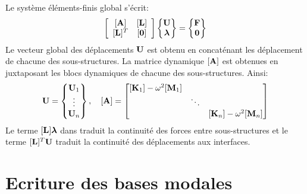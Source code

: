 \documentclass[10pt,a4paper,french]{report}
\begin{document}
Le système éléments-finis global s'écrit:
\begin{equation}\label{eq:systeme EF discretise n sous-structures}
	\left[
	\begin{array}{cc}
		{[\textbf{A}]} & {[\textbf{L}]}\\
		{[\textbf{L}]^T}& {[\textbf{0}]}
	\end{array}
	\right]\begin{Bmatrix}
		\textbf{U}\\\boldsymbol{\lambda}
	\end{Bmatrix}=\begin{Bmatrix}
		\textbf{F}\\
		\textbf{0}
	\end{Bmatrix}
\end{equation}
Le vecteur global des déplacements $\textbf{U}$ est obtenu en concaténant les déplacement de chacune des sous-structures. La matrice dynamique $[\textbf{A}]$ est obtenues en juxtaposant les blocs dynamiques de chacune des sous-structures. Ainsi:
\begin{equation}
	\textbf{U}=\begin{Bmatrix}
		\textbf{U}_1\\
		\vdots\\
		\textbf{U}_n
	\end{Bmatrix}
	, \quad
	[\textbf{A}]=
	\begin{bmatrix}
		[\textbf{K}_1]-\omega^2[\textbf{M}_1]\\
		& \ddots\\
		&&[\textbf{K}_n]-\omega^2[\textbf{M}_n]
	\end{bmatrix} 
\end{equation}
Le terme $[\textbf{L}]\boldsymbol{\lambda}$ dans  traduit la continuité des forces entre sous-structures et le terme  $[\textbf{L}]^T\textbf{U}$ traduit la continuité des déplacements aux interfaces. 

%
%

\section{Ecriture des bases modales}
\end{document}
